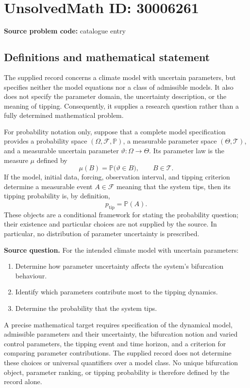 \documentclass[11pt]{article}
\begin{document}
\section*{UnsolvedMath ID: 30006261}
\textbf{Source problem code:} catalogue entry
\subsection{Definitions and mathematical statement}
The supplied record concerns a climate model with uncertain parameters, but specifies neither the model equations nor a class of admissible models. It also does not specify the parameter domain, the uncertainty description, or the meaning of tipping. Consequently, it supplies a research question rather than a fully determined mathematical problem.

For probability notation only, suppose that a complete model specification provides a probability space \((\Omega,\mathcal F,\mathbb P)\), a measurable parameter space \((\Theta,\mathcal T)\), and a measurable uncertain parameter \(\vartheta:\Omega\to\Theta\). Its parameter law is the measure \(\mu\) defined by
\[
\mu(B)=\mathbb P\bigl(\vartheta\in B\bigr),\qquad B\in\mathcal T.
\]
If the model, initial data, forcing, observation interval, and tipping criterion determine a measurable event \(A\in\mathcal F\) meaning that the system tips, then its tipping probability is, by definition,
\[
p_{\mathrm{tip}}=\mathbb P(A).
\]
These objects are a conditional framework for stating the probability question; their existence and particular choices are not supplied by the source. In particular, no distribution of parameter uncertainty is prescribed.

\textbf{Source question.} For the intended climate model with uncertain parameters:
\begin{enumerate}
\item Determine how parameter uncertainty affects the system's bifurcation behaviour.
\item Identify which parameters contribute most to the tipping dynamics.
\item Determine the probability that the system tips.
\end{enumerate}
A precise mathematical target requires specification of the dynamical model, admissible parameters and their uncertainty, the bifurcation notion and varied control parameters, the tipping event and time horizon, and a criterion for comparing parameter contributions. The supplied record does not determine these choices or universal quantifiers over a model class. No unique bifurcation object, parameter ranking, or tipping probability is therefore defined by the record alone.
\end{document}
